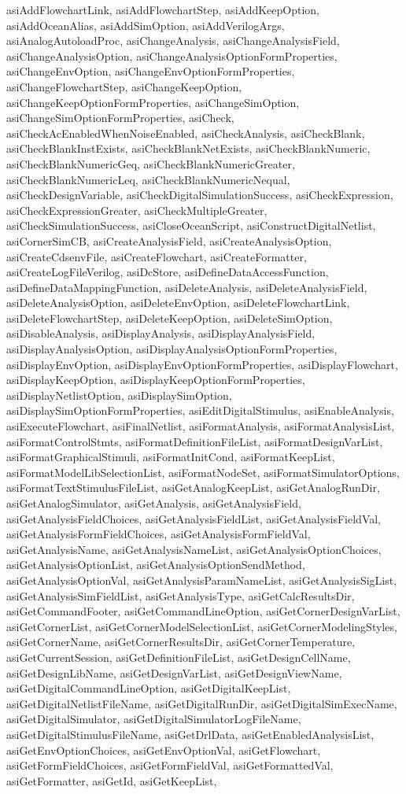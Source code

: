 {{asiAddFlowchartLink, asiAddFlowchartStep, asiAddKeepOption, asiAddOceanAlias, asiAddSimOption, asiAddVerilogArgs, asiAnalogAutoloadProc, asiChangeAnalysis, asiChangeAnalysisField, asiChangeAnalysisOption, asiChangeAnalysisOptionFormProperties, asiChangeEnvOption, asiChangeEnvOptionFormProperties, asiChangeFlowchartStep, asiChangeKeepOption, asiChangeKeepOptionFormProperties, asiChangeSimOption, asiChangeSimOptionFormProperties, asiCheck, asiCheckAcEnabledWhenNoiseEnabled, asiCheckAnalysis, asiCheckBlank, asiCheckBlankInstExists, asiCheckBlankNetExists, asiCheckBlankNumeric, asiCheckBlankNumericGeq, asiCheckBlankNumericGreater, asiCheckBlankNumericLeq, asiCheckBlankNumericNequal, asiCheckDesignVariable, asiCheckDigitalSimulationSuccess, asiCheckExpression, asiCheckExpressionGreater, asiCheckMultipleGreater, asiCheckSimulationSuccess, asiCloseOceanScript, asiConstructDigitalNetlist, asiCornerSimCB, asiCreateAnalysisField, asiCreateAnalysisOption, asiCreateCdsenvFile, asiCreateFlowchart, asiCreateFormatter, asiCreateLogFileVerilog, asiDcStore, asiDefineDataAccessFunction, asiDefineDataMappingFunction, asiDeleteAnalysis, asiDeleteAnalysisField, asiDeleteAnalysisOption, asiDeleteEnvOption, asiDeleteFlowchartLink, asiDeleteFlowchartStep, asiDeleteKeepOption, asiDeleteSimOption, asiDisableAnalysis, asiDisplayAnalysis, asiDisplayAnalysisField, asiDisplayAnalysisOption, asiDisplayAnalysisOptionFormProperties, asiDisplayEnvOption, asiDisplayEnvOptionFormProperties, asiDisplayFlowchart, asiDisplayKeepOption, asiDisplayKeepOptionFormProperties, asiDisplayNetlistOption, asiDisplaySimOption, asiDisplaySimOptionFormProperties, asiEditDigitalStimulus, asiEnableAnalysis, asiExecuteFlowchart, asiFinalNetlist, asiFormatAnalysis, asiFormatAnalysisList, asiFormatControlStmts, asiFormatDefinitionFileList, asiFormatDesignVarList, asiFormatGraphicalStimuli, asiFormatInitCond, asiFormatKeepList, asiFormatModelLibSelectionList, asiFormatNodeSet, asiFormatSimulatorOptions, asiFormatTextStimulusFileList, asiGetAnalogKeepList, asiGetAnalogRunDir, asiGetAnalogSimulator, asiGetAnalysis, asiGetAnalysisField, asiGetAnalysisFieldChoices, asiGetAnalysisFieldList, asiGetAnalysisFieldVal, asiGetAnalysisFormFieldChoices, asiGetAnalysisFormFieldVal, asiGetAnalysisName, asiGetAnalysisNameList, asiGetAnalysisOptionChoices, asiGetAnalysisOptionList, asiGetAnalysisOptionSendMethod, asiGetAnalysisOptionVal, asiGetAnalysisParamNameList, asiGetAnalysisSigList, asiGetAnalysisSimFieldList, asiGetAnalysisType, asiGetCalcResultsDir, asiGetCommandFooter, asiGetCommandLineOption, asiGetCornerDesignVarList, asiGetCornerList, asiGetCornerModelSelectionList, asiGetCornerModelingStyles, asiGetCornerName, asiGetCornerResultsDir, asiGetCornerTemperature, asiGetCurrentSession, asiGetDefinitionFileList, asiGetDesignCellName, asiGetDesignLibName, asiGetDesignVarList, asiGetDesignViewName, asiGetDigitalCommandLineOption, asiGetDigitalKeepList, asiGetDigitalNetlistFileName, asiGetDigitalRunDir, asiGetDigitalSimExecName, asiGetDigitalSimulator, asiGetDigitalSimulatorLogFileName, asiGetDigitalStimulusFileName, asiGetDrlData, asiGetEnabledAnalysisList, asiGetEnvOptionChoices, asiGetEnvOptionVal, asiGetFlowchart, asiGetFormFieldChoices, asiGetFormFieldVal, asiGetFormattedVal, asiGetFormatter, asiGetId, asiGetKeepList, }}
